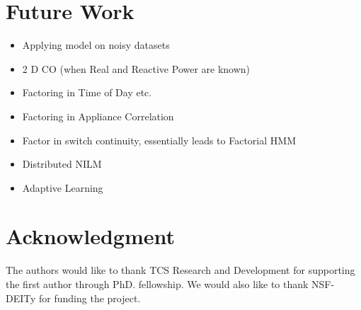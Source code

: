 \documentclass[conference]{IEEEtran}
\begin{document}
\section{Future Work}
\begin{itemize}
\item Applying model on noisy datasets
\item 2 D CO (when Real and Reactive Power are known)
\item Factoring in Time of Day etc.
\item Factoring in Appliance Correlation
\item Factor in switch continuity, essentially leads to Factorial HMM
\item Distributed NILM
\item Adaptive Learning
\end{itemize}

\section*{Acknowledgment}
The authors would like to thank TCS Research and Development for supporting the first author through PhD. fellowship. We would also like to thank NSF- DEITy for funding the project.


\end{document}
